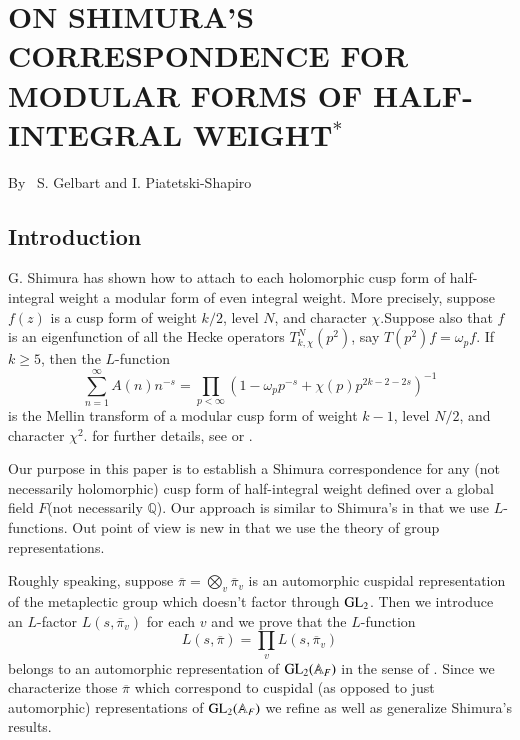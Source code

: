 \chapter{ON SHIMURA'S CORRESPONDENCE FOR MODULAR FORMS OF HALF-INTEGRAL WEIGHT$^{*}$}


\begin{center}
{\large By~ S. Gelbart and I. Piatetski-Shapiro}
\end{center}

\bigskip

\section*{Introduction}\pageoriginale

G. Shimura has shown how to attach to each holomorphic cusp form of half-integral weight a modular form of even integral weight. More precisely, suppose $f(z)$ is a cusp form of weight $k/2$, level $N$, and character $\chi$.\pageoriginale Suppose also that $f$ is an eigenfunction of all the Hecke operators $T^{N}_{k,\chi}(p^{2})$, say $T(p^{2})f=\omega_{p}f$. If $k\geq 5$, then the $L$-function
$$
\sum\limits^{\infty}_{n=1}A(n)n^{-s}=\prod\limits_{p<\infty}\left(1-\omega_{p}p^{-s}+\chi(p)p^{2k-2-2s}\right)^{-1}
$$
is the Mellin transform of a modular cusp form of weight $k-1$, level $N/2$, and character $\chi^{2}$. for further details, see \cite{Shim} or \cite{Niwa}.

Our purpose in this paper is to establish a Shimura correspondence for any (not necessarily holomorphic) cusp form of half-integral weight defined over a global field $F$(not necessarily $\mathbb{Q}$). Our approach is similar to Shimura's in that we use $L$-functions. Out point of view is new in that we use the theory of group representations.

Roughly speaking, suppose $\overline{\pi}=\bigotimes\limits_{v}\overline{\pi}_{v}$ is an automorphic cuspidal representation of the metaplectic group which doesn't factor through $\mathrm{GL}_{2}$. Then we introduce an $L$-factor $L(s,\overline{\pi}_{v})$ for each $v$ and we prove that the $L$-function
$$
L(s,\overline{\pi})=\prod\limits_{v}L(s,\overline{\pi}_{v})
$$
belongs to an automorphic representation of $\mathrm{GL}_{2}(\mathbb{A}_{F})$ in the sense of \cite{Jacquet-Langlands}. Since we characterize those $\overline{\pi}$ which correspond to cuspidal (as opposed to just automorphic) representations of $\mathrm{GL}_{2}(\mathbb{A}_{F})$ we refine as well as generalize Shimura's results.

